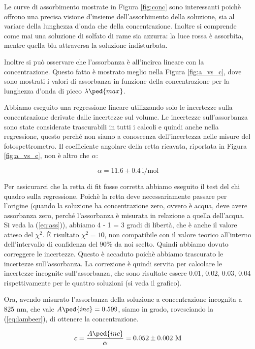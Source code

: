 Le curve di assorbimento mostrate in Figura \ref{fig:conc} sono interessanti poichè offrono una precisa visione d'insieme dell'assorbimento
della soluzione, sia al variare della lunghezza d'onda che della concentrazione. Inoltre si comprende come mai una soluzione di
solfato di rame sia azzurra: la luce rossa è assorbita, mentre quella blu attraversa la soluzione indisturbata.

Inoltre si può osservare che l'assorbanza è all'incirca lineare con la concentrazione. Questo fatto è mostrato meglio nella Figura \ref{fig:a_vs_c},
dove sono mostrati i valori di assorbanza in funzione della concentrazione per la lunghezza d'onda di picco $\lambda\ped{max}$.

Abbiamo eseguito una regressione lineare utilizzando solo le incertezze sulla concentrazione derivate dalle incertezze sul volume.
Le incertezze sull'assorbanza sono state considerate trascurabili in tutti i calcoli e quindi anche nella regressione, questo perché non
siamo a conoscenza dell'incertezza nelle misure del fotospettrometro.
Il coefficiente angolare della retta ricavata, riportata in Figura \ref{fig:a_vs_c},
non è altro che $\alpha$:

\begin{equation}
    \alpha = 11.6 \pm 0.4 ~ \text{l/mol}
\end{equation}

Per assicurarci che la retta di fit fosse corretta abbiamo eseguito il test del chi quadro sulla regressione. Poichè la retta deve necessariamente
passare per l'origine (quando la soluzione ha concentrazione zero, ovvero è acqua, deve avere assorbanza zero, perché l'assorbanza è misurata in
relazione a quella dell'acqua. Si veda la (\ref{eq:ass})), abbiamo 4 - 1 = 3 gradi di libertà, che è anche il valore atteso del $\chi^2$.
È risultato $\chi^2 = 10$, non compatibile con il valore teorico all'interno dell'intervallo di confidenza del 90\% da noi scelto.
Quindi abbiamo dovuto correggere le incertezze. Questo è accaduto poichè abbiamo trascurato
le incertezze sull'assorbanza. La correzione è quindi servita per calcolare le incertezze incognite sull'assorbanza, che sono risultate essere 0.01, 0.02,
0.03, 0.04 rispettivamente per le quattro soluzioni (si veda il grafico).

Ora, avendo misurato l'assorbanza della soluzione a concentrazione incognita a 825 nm, che vale $A\ped{inc} = 0.599$, siamo in grado, rovesciando la
(\ref{eq:lambeer}), di ottenere la concentrazione.

\begin{equation}
    c = \frac{A\ped{inc}}{\alpha} = 0.052 \pm 0.002 ~ \text{M}
\end{equation}

